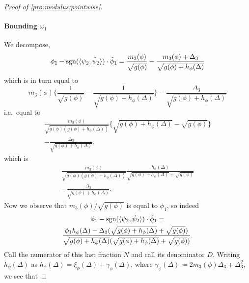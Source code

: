 \documentclass[journal]{IEEEtran}
\newcommand{\sgn}{\mathrm{sgn}}
\newcommand{\1}{\boldsymbol{1}}
\DeclarePairedDelimiter{\Inner}{\langle}{\rangle}
\begin{document}
\begin{proof}[Proof of \cref{pro:modulus:pointwise}]
	\paragraph{Bounding $\omega_1$}

	We decompose,
        \begin{equation*}
          \phi_1 - \sgn(\Inner{\psi_2,\tilde{\psi}_2})\cdot \tilde{\phi}_1\\
          = \frac{m_3(\phi)}{\sqrt{g(\phi)}} - \frac{m_3(\phi) + \Delta_3}{\sqrt{g(\phi) + h_{\phi}(\Delta)}}
        \end{equation*}
        which is in turn equal to
        \begin{equation*}
          m_3(\phi)\Big\{ \frac{1}{\sqrt{g(\phi)}} - \frac{1}{\sqrt{g(\phi) + h_{\phi}(\Delta)}} \Big\}%
		- \frac{\Delta_3}{\sqrt{g(\phi) + h_{\phi}(\Delta)}}
        \end{equation*}
        i.e.\ equal to
        \begin{multline*}
          \frac{m_3(\phi)}{\sqrt{g(\phi)(g(\phi) + h_{\phi}(\Delta))}}\big\{\sqrt{g(\phi) + h_{\phi}(\Delta)} - \sqrt{g(\phi)}  \big\}\\
          - \frac{\Delta_3}{\sqrt{g(\phi) + h_{\phi}(\Delta)}},
        \end{multline*}
        which is
        \begin{multline*}
          \frac{m_3(\phi)}{\sqrt{g(\phi)(g(\phi) + h_{\phi}(\Delta))}} \frac{h_{\phi}(\Delta)}{\sqrt{g(\phi)+h_{\phi}(\Delta)} + \sqrt{g(\phi)}}\\
          - \frac{\Delta_3}{\sqrt{g(\phi) + h_{\phi}(\Delta)}}.
        \end{multline*}
	Now we observe that $m_3(\phi)/\sqrt{g(\phi)}$ is equal to $\phi_1$, so indeed
	\begin{multline*}
		\phi_1 - \sgn(\Inner{\psi_2,\tilde{\psi}_2})\cdot \tilde{\phi}_1%
		=\\
                \frac{\phi_1 h_{\phi}(\Delta) - \Delta_3(\sqrt{g(\phi) + h_{\phi}(\Delta)} + \sqrt{g(\phi)}) }{\sqrt{g(\phi) + h_{\phi}(\Delta)}(\sqrt{g(\phi) + h_{\phi}(\Delta)} + \sqrt{g(\phi)}  )}.%
	\end{multline*}
	Call the numerator of this last fraction $N$ and call its denominator $D$. Writing $h_{\phi}(\Delta)$ as
	$h_{\phi}(\Delta) = \xi_{\phi}(\Delta) + \gamma_{\phi}(\Delta)$, where $\gamma_{\phi}(\Delta) \coloneqq 2m_3(\phi)\Delta_3 + \Delta_3^2$, we see that

\end{proof}
\end{document}
